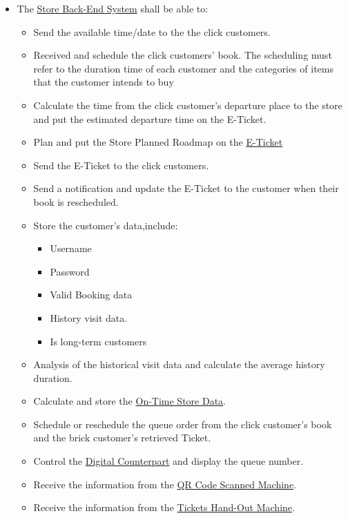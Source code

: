 \documentclass[a4paper,12pt]{report}
\begin{document}
\begin{itemize}
	\item The \hyperref[Definitions]{Store Back-End System} shall be able to:
	\begin{itemize}
		\item Send the available time/date to the the click customers.
		\item Received and schedule the click customers' book. The scheduling must refer to the duration time of each customer and the categories of items that the customer intends to buy
		\item Calculate the time from the click customer's departure place to the store and put the estimated departure time on the E-Ticket.
		\item Plan and put the Store Planned Roadmap on the \hyperref[Definitions]{E-Ticket}
		\item Send the  E-Ticket to the click customers.
		\item Send a notification and update the E-Ticket to the customer when their book is rescheduled.
		\item Store the customer's data,include:
		\begin{itemize}
			\item Username
			\item Password
			\item Valid Booking data
			\item History visit data.
			\item Is long-term customers
		\end{itemize}
		\item Analysis of the historical visit data and calculate the average history duration.
		\item Calculate and store the \hyperref[Definitions]{On-Time Store Data}.
		\item Schedule or reschedule the queue order from the click customer's book and the brick customer's retrieved Ticket.
		\item Control the \hyperref[Definitions]{Digital Counterpart} and display the queue number.
		\item Receive the information from the \hyperref[Definitions]{QR Code Scanned Machine}.
		\item Receive the information from the \hyperref[Definitions]{Tickets Hand-Out Machine}.
	\end{itemize}
\end{itemize}
\end{document}
